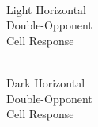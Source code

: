 \documentclass[journal,onecolumn]{IEEEtran}
\begin{document}
\begin{figure}[H]
\begin{subfigure}{0.15\textwidth}
        \caption{\\ Light Horizontal\\ Double-Opponent\\ Cell Response}
    \end{subfigure}
    \begin{subfigure}{0.15\textwidth}
        \centering
        \captionsetup{justification=centering}
        \caption{\\ Dark Horizontal\\ Double-Opponent\\ Cell Response}
    \end{subfigure}
    \begin{subfigure}{0.15\textwidth}
        \centering
        \captionsetup{justification=centering}

\end{subfigure}
\end{figure}
\end{document}
